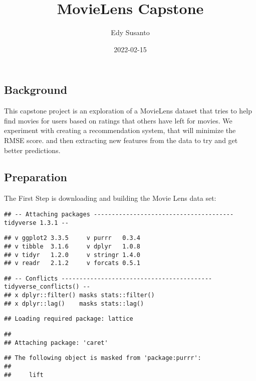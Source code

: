 \documentclass[
]{article}
\title{MovieLens Capstone}
\author{Edy Susanto}
\date{2022-02-15}
\begin{document}
\maketitle

\hypertarget{background}{%
\subsection{Background}\label{background}}

This capstone project is an exploration of a MovieLens dataset that
tries to help find movies for users based on ratings that others have
left for movies. We experiment with creating a recommendation system,
that will minimize the RMSE score. and then extracting new features from
the data to try and get better predictions.

\hypertarget{preparation}{%
\subsection{Preparation}\label{preparation}}

The First Step is downloading and building the Movie Lens data set:

\begin{verbatim}
## -- Attaching packages --------------------------------------- tidyverse 1.3.1 --
\end{verbatim}

\begin{verbatim}
## v ggplot2 3.3.5     v purrr   0.3.4
## v tibble  3.1.6     v dplyr   1.0.8
## v tidyr   1.2.0     v stringr 1.4.0
## v readr   2.1.2     v forcats 0.5.1
\end{verbatim}

\begin{verbatim}
## -- Conflicts ------------------------------------------ tidyverse_conflicts() --
## x dplyr::filter() masks stats::filter()
## x dplyr::lag()    masks stats::lag()
\end{verbatim}

\begin{verbatim}
## Loading required package: lattice
\end{verbatim}

\begin{verbatim}
## 
## Attaching package: 'caret'
\end{verbatim}

\begin{verbatim}
## The following object is masked from 'package:purrr':
## 
##     lift
\end{verbatim}
\end{document}
